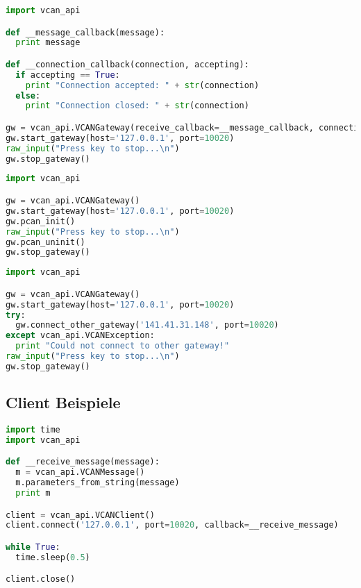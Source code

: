 \begin{lstlisting}[frame=single, language=Python, basicstyle=\footnotesize, caption={Gateway mit Callbacks}, label={lst:bsp_gateway2}]
import vcan_api

def __message_callback(message):
  print message

def __connection_callback(connection, accepting):
  if accepting == True:
    print "Connection accepted: " + str(connection)
  else:
    print "Connection closed: " + str(connection)

gw = vcan_api.VCANGateway(receive_callback=__message_callback, connection_callback=__connection_callback)
gw.start_gateway(host='127.0.0.1', port=10020)
raw_input("Press key to stop...\n")
gw.stop_gateway()
\end{lstlisting}

\begin{lstlisting}[frame=single, language=Python, basicstyle=\footnotesize, caption={Gateway mit PCAN-Anbindung}, label={lst:bsp_gateway3}]
import vcan_api

gw = vcan_api.VCANGateway()
gw.start_gateway(host='127.0.0.1', port=10020)
gw.pcan_init()
raw_input("Press key to stop...\n")
gw.pcan_uninit()
gw.stop_gateway()
\end{lstlisting}

\begin{lstlisting}[frame=single, language=Python, basicstyle=\footnotesize, caption={Gateway mit Verbindung zu anderem Gateway}, label={lst:bsp_gateway4}]
import vcan_api

gw = vcan_api.VCANGateway()
gw.start_gateway(host='127.0.0.1', port=10020)
try:
  gw.connect_other_gateway('141.41.31.148', port=10020)
except vcan_api.VCANException:
  print "Could not connect to other gateway!"
raw_input("Press key to stop...\n")
gw.stop_gateway()
\end{lstlisting}

\subsection{Client Beispiele}
\label{sec:vcan_client_beispiele}
\begin{lstlisting}[frame=single, language=Python, basicstyle=\footnotesize, caption={Empfangsclient via Callback}, label={lst:bsp_client1}]
import time
import vcan_api

def __receive_message(message):
  m = vcan_api.VCANMessage()
  m.parameters_from_string(message)
  print m

client = vcan_api.VCANClient()
client.connect('127.0.0.1', port=10020, callback=__receive_message)

while True:
  time.sleep(0.5)

client.close()
\end{lstlisting}

